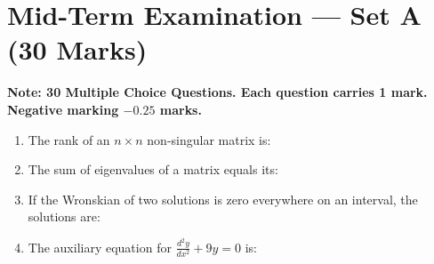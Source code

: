 \section{Mid-Term Examination --- Set A (30 Marks)}
\label{sec:midterm_set_a}


\begin{center}
\sffamily\textbf{\color{AlertRed}Note: 30 Multiple Choice Questions. Each question carries 1 mark. Negative marking $-0.25$ marks.}
\end{center}

\begin{enumerate}[label=\textbf{\arabic*.}]
    \item The rank of an $n \times n$ non-singular matrix is:
    \item The sum of eigenvalues of a matrix equals its:
    \item If the Wronskian of two solutions is zero everywhere on an interval, the solutions are:
    \item The auxiliary equation for $\frac{d^2 y}{dx^2} + 9y = 0$ is:
\end{enumerate}
